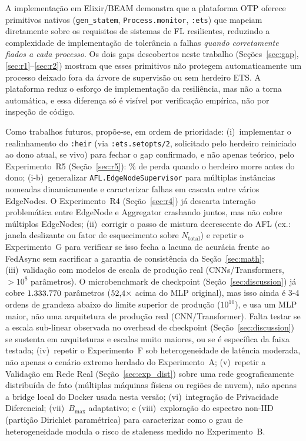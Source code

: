 \documentclass[conference,a4paper]{IEEEtran}
\begin{document}
A implementação em Elixir/BEAM demonstra que a plataforma OTP oferece
primitivos nativos (\texttt{gen\_statem}, \texttt{Process.monitor},
\texttt{:ets}) que mapeiam diretamente sobre os requisitos de sistemas
de FL resilientes, reduzindo a complexidade de implementação de
tolerância a falhas \emph{quando corretamente fiados a cada processo}. Os
dois gaps descobertos neste trabalho (Seções~\ref{sec:gap},
\ref{sec:r1}--\ref{sec:r2}) mostram que esses primitivos não protegem
automaticamente um processo deixado fora da árvore de supervisão ou sem
herdeiro ETS. A plataforma reduz o esforço de implementação da
resiliência, mas não a torna automática, e essa diferença só é visível
por verificação empírica, não por inspeção de código.

Como trabalhos futuros, propõe-se, em ordem de prioridade: (i)~implementar
o realinhamento do \texttt{:heir} (via \texttt{:ets.setopts/2}, solicitado
pelo herdeiro reiniciado ao dono atual, se vivo) para fechar o gap
confirmado, e não apenas teórico, pelo Experimento~R5
(Seção~\ref{sec:r5}): \statExpRFiveHeirDeadPct{}\% de perda quando o
herdeiro morre antes do dono; (i-b)~generalizar
\texttt{AFL.EdgeNodeSupervisor} para múltiplas instâncias nomeadas
dinamicamente e caracterizar falhas em cascata entre vários EdgeNodes. O
Experimento~R4 (Seção~\ref{sec:r4}) já descarta interação problemática
entre EdgeNode e Aggregator crashando juntos, mas não cobre múltiplos
EdgeNodes;
(ii)~corrigir o passo de mistura decrescente do AFL (ex.: janela
deslizante ou fator de esquecimento sobre $N_{\text{total}}$) e repetir o
Experimento~G para verificar se isso fecha a lacuna de acurácia frente ao
FedAsync sem sacrificar a garantia de consistência da Seção~\ref{sec:math};
(iii)~validação com modelos de escala de produção real
(CNNs/Transformers, $>10^8$ parâmetros). O microbenchmark de
checkpoint (Seção~\ref{sec:discussion}) já cobre $1{.}333{.}770{}$
parâmetros ($52{,}4\times$ acima do MLP original), mas isso ainda é
3-4 ordens de grandeza abaixo do limite superior de produção
($10^{10}$), e usa um MLP maior, não uma arquitetura de produção real
(CNN/Transformer). Falta testar se a escala sub-linear observada no
overhead de checkpoint (Seção~\ref{sec:discussion}) se sustenta em
arquiteturas e escalas muito maiores, ou se é específica da faixa
testada; (iv)~repetir o Experimento~F
sob heterogeneidade de latência moderada, não apenas o cenário extremo
herdado do Experimento~A; (v)~repetir a Validação em Rede Real
(Seção~\ref{sec:exp_dist}) sobre uma rede geograficamente distribuída de
fato (múltiplas máquinas físicas ou regiões de nuvem), não apenas a
bridge local do Docker usada nesta versão; (vi)~integração de Privacidade
Diferencial; (vii)~$B_{\max}$ adaptativo; e (viii)~exploração do espectro
non-IID (partição Dirichlet paramétrica) para caracterizar como o grau de
heterogeneidade modula o risco de staleness medido no Experimento~B.



\end{document}
